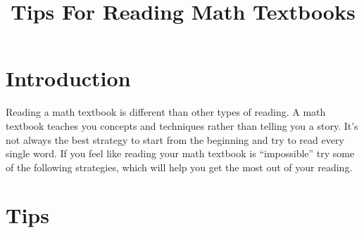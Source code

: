 \documentclass[../main.tex]{subfiles}
\title{Tips For Reading Math Textbooks}
\begin{document}
\maketitle
%
\section{Introduction}
Reading a math textbook is different than other types of reading.
A math textbook teaches you concepts and techniques rather than
telling you a story. It's not always the best strategy to start
from the beginning and try to read every single word.
If you feel like reading your math textbook is ``impossible''
try some of the following strategies, which will help you
get the most out of your reading.
%
\section{Tips}
\end{document}
